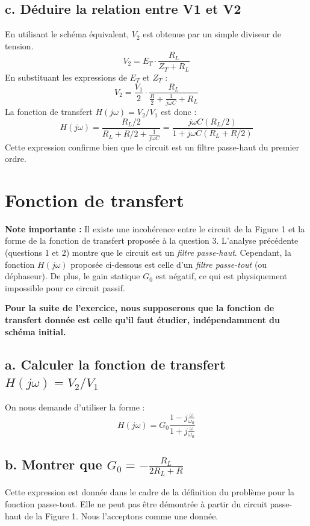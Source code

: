 \documentclass[12pt,a4paper]{article}
\begin{document}
\subsection*{c. Déduire la relation entre V1 et V2}
En utilisant le schéma équivalent, \(V_2\) est obtenue par un simple diviseur de tension.
\begin{equation}
    V_2 = E_T \cdot \frac{R_L}{Z_T + R_L}
\end{equation}
En substituant les expressions de \(E_T\) et \(Z_T\) :
\begin{equation}
    V_2 = \frac{V_1}{2} \cdot \frac{R_L}{\frac{R}{2} + \frac{1}{j\omega C} + R_L}
\end{equation}
La fonction de transfert \(H(j\omega) = V_2/V_1\) est donc :
\begin{equation}
    H(j\omega) = \frac{R_L/2}{R_L + R/2 + \frac{1}{j\omega C}} = \frac{j\omega C (R_L/2)}{1 + j\omega C (R_L + R/2)}
\end{equation}
Cette expression confirme bien que le circuit est un filtre passe-haut du premier ordre.

\section{Fonction de transfert}

\textbf{Note importante :} Il existe une incohérence entre le circuit de la Figure 1 et la forme de la fonction de transfert proposée à la question 3. L'analyse précédente (questions 1 et 2) montre que le circuit est un \textit{filtre passe-haut}. Cependant, la fonction \(H(j\omega)\) proposée ci-dessous est celle d'un \textit{filtre passe-tout} (ou déphaseur). De plus, le gain statique \(G_0\) est négatif, ce qui est physiquement impossible pour ce circuit passif.

\textbf{Pour la suite de l'exercice, nous supposerons que la fonction de transfert donnée est celle qu'il faut étudier, indépendamment du schéma initial.}

\subsection*{a. Calculer la fonction de transfert \(H(j\omega) = V_2/V_1\)}
On nous demande d'utiliser la forme :
\begin{equation}
    H(j\omega) = G_0 \frac{1 - j\frac{\omega}{\omega_0}}{1 + j\frac{\omega}{\omega_0}}
\end{equation}

\subsection*{b. Montrer que \(G_0 = -\frac{R_L}{2R_L+R}\)}
Cette expression est donnée dans le cadre de la définition du problème pour la fonction passe-tout. Elle ne peut pas être démontrée à partir du circuit passe-haut de la Figure 1. Nous l'acceptons comme une donnée.
\end{document}
